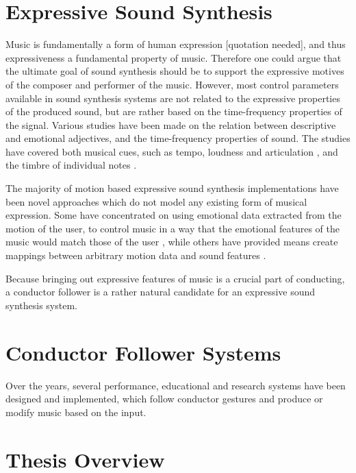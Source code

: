 \section{Expressive Sound Synthesis}

Music is fundamentally a form of human expression [quotation needed],
and thus expressiveness a fundamental property of music.
Therefore one could argue that the ultimate goal of sound synthesis should be to support
the expressive motives of the composer and performer of the music.
However, most control parameters available in sound synthesis systems
are not related to the expressive properties of the produced sound,
but are rather based on the time-frequency properties of the signal.
Various studies have been made on the relation between
descriptive and emotional adjectives,
and the time-frequency properties of sound.
The studies have covered both musical cues,
such as tempo, loudness and articulation \cite{juslin2000cue},
and the timbre of individual notes \cite{moravec2005}.

The majority of motion based expressive sound synthesis implementations
have been novel approaches which do not model any existing form of musical expression.
Some have concentrated on using emotional data
extracted from the motion of the user,
to control music in a way that the
emotional features of the music would match those of the user \cite{friberg2004},
while others have provided means create mappings
between arbitrary motion data and sound features \cite{kia2004}.

Because bringing out expressive features of music is a crucial part of conducting,
a conductor follower is a rather natural candidate for
an expressive sound synthesis system.

\section{Conductor Follower Systems}

Over the years, several performance, educational and research systems
have been designed and implemented,
which follow conductor gestures and produce or modify music based on the input.


\section{Thesis Overview}


